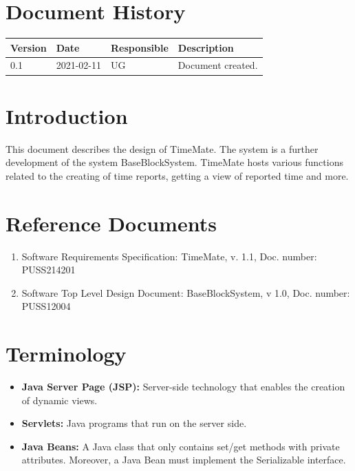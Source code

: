 \documentclass{article}
\date {#1}
\title {
    \documentNumber {01}    
    
    \documentVersion {0.3}
    
    \documentTitle {Software Top Level Design Document}
    \documentGroup {2}
    
    \documentResponsible {System Group}
    \documentAuthors {Developer Group}
    
    \documentDate {2021-02-18}
}
\begin{document}
\maketitle
\thispagestyle{empty}

\newpage

\tableofcontents

\newpage


\section{Document History}
\begin{tabular}{ l | l | l | l }
    Version & Date & Responsible & Description \\
    \hline
    0.1 & 2021-02-11 & UG & Document created. \\
\end{tabular}

\section{Introduction}
This document describes the design of TimeMate. The system is a further development of the system BaseBlockSystem. TimeMate hosts various functions related to the creating of time reports, getting a view of reported time and more.

\section{Reference Documents}
\begin{enumerate}
    \item Software Requirements Specification: TimeMate, v. 1.1, Doc. number: PUSS214201
    \item Software Top Level Design Document: BaseBlockSystem, v 1.0, Doc. number: PUSS12004
\end{enumerate}

\section{Terminology}
\begin{itemize}
\item \textbf{Java Server Page (JSP):} Server-side technology that enables the creation of dynamic views.
\item \textbf{Servlets:} Java programs that run on the server side.
\item \textbf{Java Beans:} A Java class that only contains set/get methods with private attributes. Moreover, a Java Bean must implement the Serializable interface.
\end{itemize}
\end{document}
